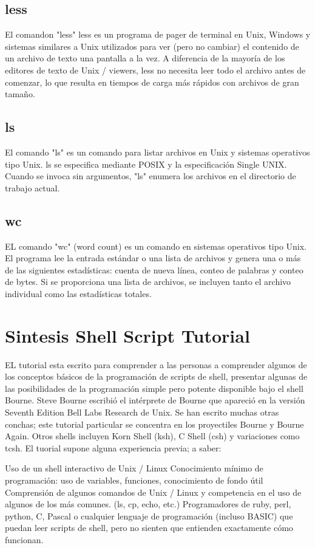 \documentclass{article}
\begin{document}
\subsection{less}
El comandon "less" less es un programa de pager de terminal en Unix, Windows y sistemas similares a Unix utilizados para ver (pero no cambiar) el contenido de un archivo de texto una pantalla a la vez. A diferencia de la mayoría de los editores de texto de Unix / viewers, less no necesita leer todo el archivo antes de comenzar, lo que resulta en tiempos de carga más rápidos con archivos de gran tamaño.
\subsection{ls}
El comando "ls" es un comando para listar archivos en Unix y sistemas operativos tipo Unix. ls se especifica mediante POSIX y la especificación Single UNIX. Cuando se invoca sin argumentos, "ls" enumera los archivos en el directorio de trabajo actual.
\subsection{wc}
EL comando "wc" (word count) es un comando en sistemas operativos tipo Unix. El programa lee la entrada estándar o una lista de archivos y genera una o más de las siguientes estadísticas: cuenta de nueva línea, conteo de palabras y conteo de bytes. Si se proporciona una lista de archivos, se incluyen tanto el archivo individual como las estadísticas totales.
\section{Sintesis Shell Script Tutorial}
EL tutorial esta escrito para comprender a las personas a comprender algunos de los conceptos básicos de la programación de scripts de shell, presentar algunas de las posibilidades de la programación simple pero potente disponible bajo el shell Bourne. Steve Bourne escribió el intérprete de Bourne que apareció en la versión Seventh Edition Bell Labs Research de Unix. Se han escrito muchas otras conchas; este tutorial particular se concentra en los proyectiles Bourne y Bourne Again. Otros shells incluyen Korn Shell (ksh), C Shell (csh) y variaciones como tcsh. El tuorial supone alguna experiencia previa; a saber:

Uso de un shell interactivo de Unix / Linux
Conocimiento mínimo de programación: uso de variables, funciones, conocimiento de fondo útil
Comprensión de algunos comandos de Unix / Linux y competencia en el uso de algunos de los más comunes. (ls, cp, echo, etc.)
Programadores de ruby, perl, python, C, Pascal o cualquier lenguaje de programación (incluso BASIC) que puedan leer scripts de shell, pero no sienten que entienden exactamente cómo funcionan.
\end{document}
